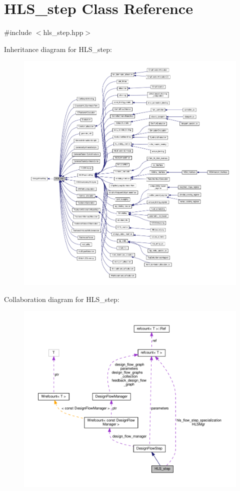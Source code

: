\hypertarget{classHLS__step}{}\section{H\+L\+S\+\_\+step Class Reference}
\label{classHLS__step}


{\ttfamily \#include $<$hls\+\_\+step.\+hpp$>$}



Inheritance diagram for H\+L\+S\+\_\+step\+:
\nopagebreak
\begin{figure}[H]
\begin{center}
\leavevmode
\includegraphics[width=350pt]{d2/dfd/classHLS__step__inherit__graph}
\end{center}
\end{figure}


Collaboration diagram for H\+L\+S\+\_\+step\+:
\nopagebreak
\begin{figure}[H]
\begin{center}
\leavevmode
\includegraphics[width=350pt]{d4/d40/classHLS__step__coll__graph}
\end{center}
\end{figure}
